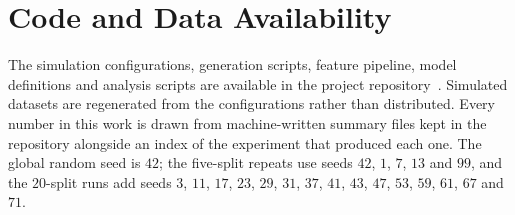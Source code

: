 \section{Code and Data Availability}
\label{app:reproducibility}

The simulation configurations, generation scripts, feature pipeline, model definitions and analysis scripts are available in the project repository~\cite{battat2026csilocation}. Simulated datasets are regenerated from the configurations rather than distributed. Every number in this work is drawn from machine-written summary files kept in the repository alongside an index of the experiment that produced each one. The global random seed is $42$; the five-split repeats use seeds $42$, $1$, $7$, $13$ and $99$, and the $20$-split runs add seeds $3$, $11$, $17$, $23$, $29$, $31$, $37$, $41$, $43$, $47$, $53$, $59$, $61$, $67$ and $71$.

